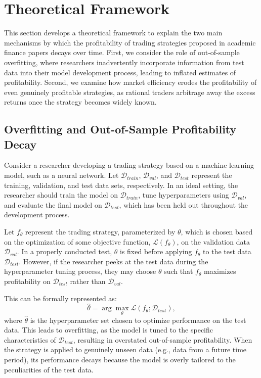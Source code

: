 \section{Theoretical Framework}

This section develops a theoretical framework to explain the two main mechanisms by which the profitability of trading strategies proposed in academic finance papers decays over time. First, we consider the role of out-of-sample overfitting, where researchers inadvertently incorporate information from test data into their model development process, leading to inflated estimates of profitability. Second, we examine how market efficiency erodes the profitability of even genuinely profitable strategies, as rational traders arbitrage away the excess returns once the strategy becomes widely known.

\subsection{Overfitting and Out-of-Sample Profitability Decay}

Consider a researcher developing a trading strategy based on a machine learning model, such as a neural network. Let $\mathcal{D}_{train}$, $\mathcal{D}_{val}$, and $\mathcal{D}_{test}$ represent the training, validation, and test data sets, respectively. In an ideal setting, the researcher should train the model on $\mathcal{D}_{train}$, tune hyperparameters using $\mathcal{D}_{val}$, and evaluate the final model on $\mathcal{D}_{test}$, which has been held out throughout the development process.

Let $f_{\theta}$ represent the trading strategy, parameterized by $\theta$, which is chosen based on the optimization of some objective function, $\mathcal{L}(f_{\theta})$, on the validation data $\mathcal{D}_{val}$. In a properly conducted test, $\theta$ is fixed before applying $f_{\theta}$ to the test data $\mathcal{D}_{test}$. However, if the researcher peeks at the test data during the hyperparameter tuning process, they may choose $\theta$ such that $f_{\theta}$ maximizes profitability on $\mathcal{D}_{test}$ rather than $\mathcal{D}_{val}$.

This can be formally represented as:
\[
\hat{\theta} = \arg \max_{\theta} \mathcal{L}(f_{\theta}; \mathcal{D}_{test}),
\]
where $\hat{\theta}$ is the hyperparameter set chosen to optimize performance on the test data. This leads to overfitting, as the model is tuned to the specific characteristics of $\mathcal{D}_{test}$, resulting in overstated out-of-sample profitability. When the strategy is applied to genuinely unseen data (e.g., data from a future time period), its performance decays because the model is overly tailored to the peculiarities of the test data.

